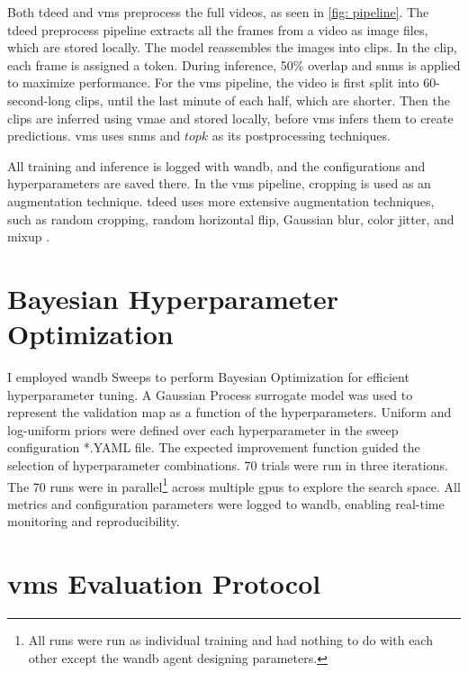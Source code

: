 Both \acrfull{tdeed} and \acrfull{vms} preprocess the full videos, as seen in \cref{fig: pipeline}. The \acrshort{tdeed} preprocess pipeline extracts all the frames from a video as image files, which are stored locally. The model reassembles the images into clips. In the clip, each frame is assigned a token. During inference, 50\% overlap and \acrfull{snms} is applied to maximize performance. For the \acrshort{vms} pipeline, the video is first split into 60-second-long clips, until the last minute of each half, which are shorter. Then the clips are inferred using \acrshort{vmae} and stored locally, before \acrshort{vms} infers them to create predictions. \acrshort{vms} uses \acrshort{snms} and $topk$ as its postprocessing techniques. 

All training and inference is logged with \acrfull{wandb}, and the configurations and hyperparameters are saved there. In the \acrshort{vms} pipeline, cropping is used as an augmentation technique. \acrshort{tdeed} uses more extensive augmentation techniques, such as random cropping, random horizontal flip, Gaussian blur, color jitter, and mixup \cite{xarles_t-deed_2024}.

\section{Bayesian Hyperparameter Optimization}
\label{sec:bayesian_optimization}

I employed \acrshort{wandb} Sweeps to perform Bayesian Optimization for efficient hyperparameter tuning. A Gaussian Process surrogate model was used to represent the validation \acrshort{map} as a function of the hyperparameters. Uniform and log-uniform priors were defined over each hyperparameter in the sweep configuration *.YAML file. The expected improvement function guided the selection of hyperparameter combinations. 70 trials were run in three iterations. The 70 runs were in parallel\footnote{All runs were run as individual training and had nothing to do with each other except the \acrshort{wandb} agent designing parameters.} across multiple \acrshort{gpu}s to explore the search space. All metrics and configuration parameters were logged to \acrshort{wandb}, enabling real-time monitoring and reproducibility. 


\section{\acrshort{vms} Evaluation Protocol}
\label{sec:eval_protocol}

